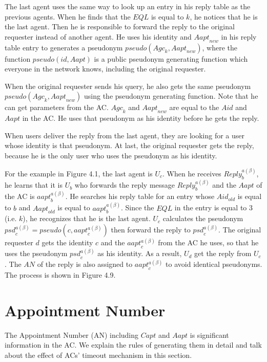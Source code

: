 The last agent uses the same way to look up an entry in his reply table as the previous agents. When he finds that the $EQL$ is equal to $k$, he notices that he is the last agent. Then he is responsible to forward the reply to the original requester instead of another agent. He uses his identity and ${Aapt}_{new}$ in his reply table entry to generates a pseudonym $pseudo\left({Agc}_k,{Aapt}_{new}\right)$, where the function $pseudo\left(id,Aapt\right)$ is a public pseudonym generating function which everyone in the network knows, including the original requester.

When the original requester sends his query, he also gets the same pseudonym $pseudo\left({Agc}_k,{Aapt}_{new}\right)$ using the pseudonym generating function. Note that he can get parameters from the AC. ${Agc}_k$ and ${Aapt}_{new}$ are equal to the $Aid$ and $Aapt$ in the AC. He uses that pseudonym as his identity before he gets the reply.

When users deliver the reply from the last agent, they are looking for a user whose identity is that pseudonym. At last, the original requester gets the reply, because he is the only user who uses the pseudonym as his identity.

For the example in Figure 4.1, the last agent is $U_c$. When he receives ${Reply}^{a\left(\beta\right)}_b$, he learns that it is $U_b$ who forwards the reply message ${Reply}^{a\left(\beta\right)}_b$ and the $Aapt$ of the AC is ${aapt}^{a\left(\beta\right)}_b$. He searches his reply table for an entry whose ${Aid}_{old}$ is equal to $b$ and ${Aapt}_{old}$ is equal to ${aapt}^{a\left(\beta\right)}_b$. Since the $EQL$ in the entry is equal to 3 (i.e. $k$), he recognizes that he is the last agent. $U_c$ calculates the pseudonym ${psd}^{a\left(\beta \right)}_c=pseudo\left(c,{aapt}^{a\left(\beta\right)}_c\right)$ then forward the reply to ${psd}^{a\left(\beta\right)}_c$. The original requester $d$ gets the identity $c$ and the ${aapt}^{a\left(\beta \right)}_c$ from the AC he uses, so that he uses the pseudonym ${psd}^{a\left(\beta \right)}_c$ as his identity. As a result, $U_d$ get the reply from $U_c$. The $AN$ of the reply is also assigned to ${aapt}^{a\left(\beta\right)}_c$ to avoid identical pseudonyms. The process is shown in Figure 4.9. 


\section{ Appointment Number}

\noindent The Appointment Number (AN) including $Capt$ and $Aapt$ is significant information in the AC. We explain the rules of generating them in detail and talk about the effect of ACs' timeout mechanism in this section.


